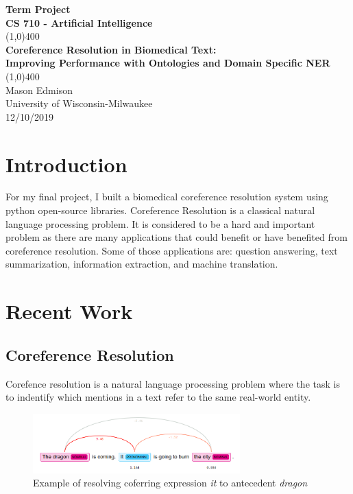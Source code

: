 \documentclass[11pt]{article}
\begin{document}
\begin{titlepage}
\begin{center}
\Large{\textbf{Term Project}} \\
\Large{\textbf{CS 710 - Artificial Intelligence}} \\

\vfill
\line(1,0){400} \\

\Large{\textbf{Coreference Resolution in Biomedical Text:}} \\
\Large{\textbf{Improving Performance with Ontologies and Domain Specific NER}} \\

\line(1,0){400}\\
\vfill
Mason Edmison\\
University of Wisconsin-Milwaukee\\
12/10/2019
\end{center}
\end{titlepage}

\section{Introduction}
For my final project, I built a biomedical coreference resolution system using python open-source libraries. Coreference Resolution is a classical natural language processing problem. It is considered to be a hard and important problem as there are many applications that could benefit or have benefited from coreference resolution. Some of those applications are: question answering, text summarization, information extraction, and machine translation.

\section{Recent Work}

\subsection{Coreference Resolution}
Corefence resolution is a natural language processing problem where the task is to indentify which mentions in a text refer to the same real-world entity. 

\begin{figure}[h]
\includegraphics[width=8cm]{coref_vis}
\centering
\caption{Example of resolving coferring expression \textit{it} to antecedent \textit{dragon}}
\end{figure}
\end{document}
